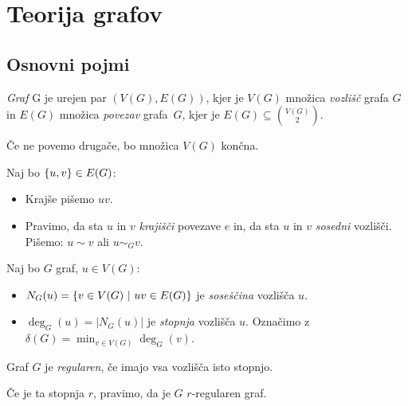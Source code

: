 \section{Teorija grafov}
\subsection{Osnovni pojmi}
\begin{definicija}
    \emph{Graf} G je urejen par $(V(G), E(G))$, kjer je $V(G)$ množica \emph{vozlišč} grafa $G$ in $E(G)$ množica \emph{povezav} grafa~$G$, kjer je $E(G) \subseteq \binom{V(G)}{2}$.
\end{definicija}

\begin{opomba}
    Če ne povemo drugače, bo množica $V(G)$ končna.
\end{opomba}

\begin{opomba}
    Naj bo $\left\{u, v\right\} \in E(G)$:
    \begin{itemize}
        \item Krajše pišemo $uv$.
        \item Pravimo, da sta $u$ in $v$ \emph{krajišči} povezave $e$ in, da sta $u$ in $v$ \emph{sosedni} vozlišči.        
        Pišemo: $u \sim v$ ali $u \sim_G v$.
    \end{itemize}
\end{opomba}

\begin{definicija}
    Naj bo $G$ graf, $u \in V(G)$:
    \begin{itemize}
        \item $N_G(u) = \left\{v \in V(G) \ | \ uv \in E(G)\right\}$ je \emph{soseščina} vozlišča $u$.
        \item $\deg_G(u) = |N_G(u)|$ je \emph{stopnja} vozlišča $u$. Označimo z $\delta(G) = \min_{v \in V(G)}\deg_G(v)$.
    \end{itemize}
\end{definicija}

\begin{definicija}
    Graf $G$ je \emph{regularen}, če imajo vsa vozlišča isto stopnjo.
\end{definicija}

\begin{opomba}
    Če je ta stopnja $r$, pravimo, da je $G$ $r$-regularen graf.
\end{opomba}

